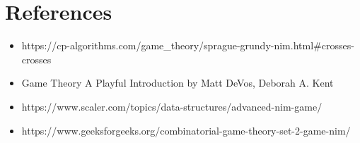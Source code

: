 \documentclass[11pt]{article}
\begin{document}
\section{References}
\begin{itemize}
    \item https://cp-algorithms.com/game\_theory/sprague-grundy-nim.html#crosses-crosses
    \item Game Theory A Playful Introduction by Matt DeVos, Deborah A. Kent
    \item https://www.scaler.com/topics/data-structures/advanced-nim-game/   
    \item https://www.geeksforgeeks.org/combinatorial-game-theory-set-2-game-nim/
\end{itemize}
\end{document}
